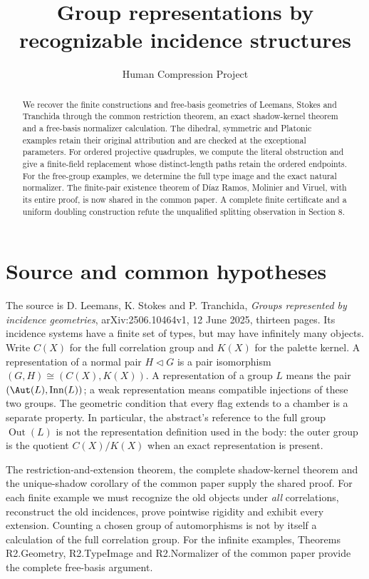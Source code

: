
\title{Group representations by recognizable incidence structures}
\author{Human Compression Project}
\date{}

\maketitle
\begin{abstract}
We recover the finite constructions and free-basis geometries of Leemans,
Stokes and Tranchida through the common restriction theorem, an exact
shadow-kernel theorem and a free-basis normalizer calculation. The dihedral,
symmetric and Platonic examples retain their original attribution and are
checked at the exceptional parameters. For ordered projective quadruples,
we compute the literal obstruction and give a finite-field replacement
whose distinct-length paths retain the ordered endpoints. For the free-group examples, we determine the full type
image and the exact natural normalizer. The finite-pair existence theorem
of D\'iaz Ramos, Molinier and Viruel, with its entire proof, is now
shared in the common paper. A complete finite certificate and a uniform doubling
construction refute the unqualified splitting observation in Section 8.
\end{abstract}

\section{Source and common hypotheses}
The source is D. Leemans, K. Stokes and P. Tranchida,
\emph{Groups represented by incidence geometries},
arXiv:2506.10464v1, 12 June 2025, thirteen pages. Its incidence systems
have a finite set of types, but may have infinitely many objects. Write
$C(X)$ for the full correlation group and $K(X)$ for the palette kernel.
A representation of a normal pair $H\lhd G$ is a pair isomorphism
$(G,H)\cong(C(X),K(X))$. A representation of a group $L$ means the pair
$(\Aut(L),\operatorname{Inn}(L))$; a weak representation means compatible
injections of these two groups. The geometric condition that every flag
extends to a chamber is a separate property. In particular, the abstract's
reference to the full group $\operatorname{Out}(L)$ is not the
representation definition used in the body: the outer group is the
quotient $C(X)/K(X)$ when an exact representation is present.

The restriction-and-extension theorem, the complete shadow-kernel theorem
and the unique-shadow corollary of the common paper supply the shared proof. For each finite example
we must recognize the old objects under \emph{all} correlations, reconstruct
the old incidences, prove pointwise rigidity and exhibit every extension.
Counting a chosen group of automorphisms is not by itself a calculation
of the full correlation group. For the infinite examples, Theorems
R2.Geometry, R2.TypeImage and R2.Normalizer of the common paper provide
the complete free-basis argument.







